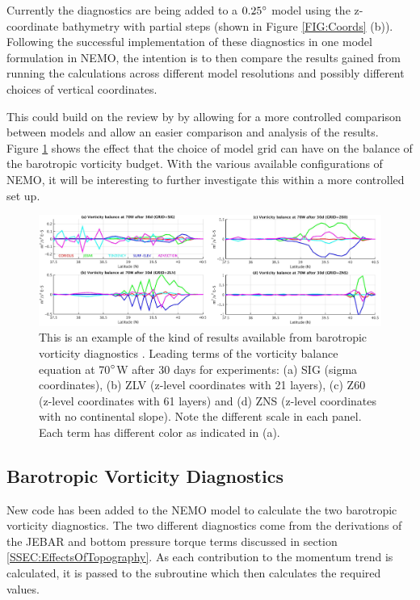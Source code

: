 \documentclass[..\report.tex]{subfiles}
\begin{document}
Currently the diagnostics are being added to a $0.25\degree$ model using the z-coordinate bathymetry with partial steps (shown in Figure \ref{FIG:Coords} (b)).
Following the successful implementation of these diagnostics in one model formulation in \gls{NEMO}, the intention is to then compare the results gained from running the calculations across different model resolutions and possibly different choices of vertical coordinates.

This could build on the review by \citet{Ezer2016b} by allowing for a more controlled comparison between models and allow an easier comparison and analysis of the results. Figure \ref{FIG:Ezer2016bFig8} \citep[Fig. 8]{Ezer2016b} shows the effect that the choice of model grid can have on the balance of the barotropic vorticity budget. With the various available configurations of \gls{NEMO}, it will be interesting to further investigate this within a more controlled set up.

\begin{figure}[t]
    \includegraphics[width=\linewidth]{Figures/Ezer2016bFig8.jpg}
    \caption{This is an example of the kind of results available from barotropic vorticity diagnostics \citep[Fig 8.]{Ezer2016b}. Leading terms of the vorticity balance equation at 70$\degree$W after 30 days for experiments: (a) SIG (sigma coordinates), (b) ZLV (z-level coordinates with 21 layers), (c) Z60 (z-level coordinates with 61 layers) and (d) ZNS (z-level coordinates with no continental slope). Note the different scale in each panel. Each term has different color as indicated in (a).}
    \label{FIG:Ezer2016bFig8}
\end{figure}


\subsection{Barotropic Vorticity Diagnostics}
\label{SSEC:BVDiagnostics}


New code has been added to the \gls{NEMO} model to calculate the two barotropic vorticity diagnostics. The two different diagnostics come from the derivations of the \gls{JEBAR} and bottom pressure torque terms discussed in section \ref{SSEC:EffectsOfTopography}. As each contribution to the momentum trend is calculated, it is passed to the subroutine which then calculates the required values.
\end{document}
